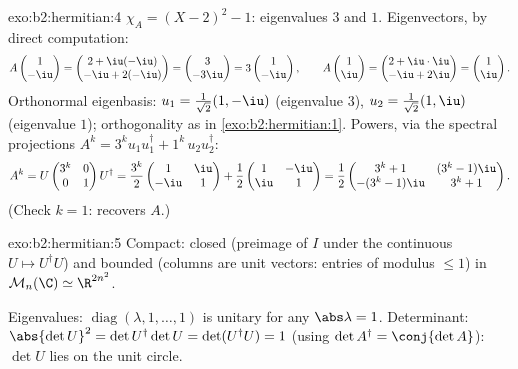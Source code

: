 \begin{solution}{exo:b2:hermitian:4}
$\chi_A = (X-2)^2 - 1$: eigenvalues $3$ and $1$. Eigenvectors, by
direct computation:
\[
A\begin{pmatrix}1\\ -\iu\end{pmatrix}
= \begin{pmatrix} 2 + \iu(-\iu)\\ -\iu + 2(-\iu)\end{pmatrix}
= \begin{pmatrix} 3\\ -3\iu \end{pmatrix}
= 3\begin{pmatrix}1\\ -\iu\end{pmatrix},
\qquad
A\begin{pmatrix}1\\ \iu\end{pmatrix}
= \begin{pmatrix} 2 + \iu\cdot\iu\\ -\iu + 2\iu\end{pmatrix}
= \begin{pmatrix}1\\ \iu\end{pmatrix}.
\]
Orthonormal eigenbasis: $u_1 = \frac{1}{\sqrt2}(1, -\iu)$
(eigenvalue $3$), $u_2 = \frac{1}{\sqrt2}(1, \iu)$ (eigenvalue
$1$); orthogonality as in \cref{exo:b2:hermitian:1}. Powers, via
the spectral projections $A^k = 3^k u_1u_1^\dagger + 1^k\,
u_2u_2^\dagger$:
\[
A^k = U\begin{pmatrix} 3^k & 0\\ 0 & 1\end{pmatrix}U^\dagger
= \frac{3^k}{2}\begin{pmatrix} 1 & \iu\\ -\iu & 1\end{pmatrix}
+ \frac{1}{2}\begin{pmatrix} 1 & -\iu\\ \iu & 1\end{pmatrix}
= \frac12\begin{pmatrix}
3^k + 1 & (3^k - 1)\iu\\
-(3^k-1)\iu & 3^k + 1
\end{pmatrix}.
\]
(Check $k = 1$: recovers $A$.)
\end{solution}

\begin{solution}{exo:b2:hermitian:5}
Compact: closed (preimage of $I$ under the continuous $U \mapsto
U^\dagger U$) and bounded (columns are unit vectors: entries of
modulus $\leq 1$) in $\mathcal{M}_n(\C) \simeq \R^{2n^2}$.

Eigenvalues: $\operatorname{diag}(\lambda, 1, \dots, 1)$ is unitary
for any $\abs\lambda = 1$. Determinant: $\abs{\det U}^2 = \det
U^\dagger \det U = \det(U^\dagger U) = 1$ (using $\det A^\dagger =
\conj{\det A}$): $\det U$ lies on the unit circle.
\end{solution}

